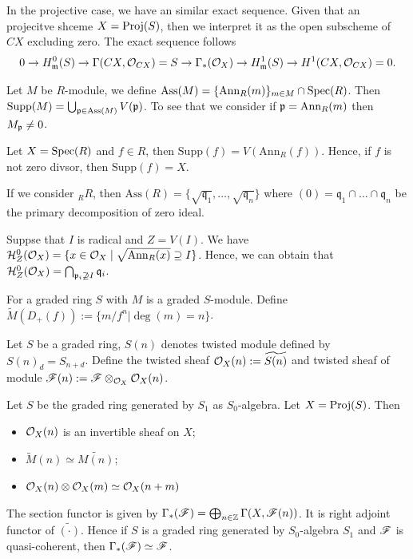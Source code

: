 {\np In the projective case, we have an similar exact sequence. Given that an projecitve shceme $X=\operatorname{Proj}(S)$, then we interpret it as the open subscheme of $CX$ excluding zero.
The exact sequence follows 
\begin{align*}
    0\to H^0_{\mathfrak{m}}(S) \to \Gamma(CX,\mathcal{O}_{CX})= S \to \Gamma_*(\mathcal{O}_X)\to  H^1_{\mathfrak{m}}(S) \to H^1(CX,\mathcal{O}_{CX})=0.
\end{align*}

\np Let $M$ be $R$-module, we define $\text{Ass}(M)=\{\text{Ann}_R(m)\}_{m\in M}\cap \operatorname{Spec}(R)$. Then $\text{Supp}(M)=\bigcup_{\mathfrak{p}\in \text{Ass}(M)}V(\mathfrak{p})$.
To see that we consider if $\mathfrak{p}=\text{Ann}_R(m)$ then $M_{\mathfrak{p}}\neq 0$.

\np Let $X=\operatorname{Spec}(R)$ and $f\in R$, then $\text{Supp}(f)=V(\text{Ann}_R(f))$. Hence, if $f$ is not zero divsor, then $\text{Supp}(f)=X$.

\np If we consider $_R R$, then $\text{Ass}(R)=\{\sqrt{\mathfrak{q}_1},\dots,\sqrt{\mathfrak{q}_n}\}$
where $(0) = {\mathfrak{q}_1}\cap \dots\cap {\mathfrak{q}_n}$ be the primary decomposition of zero ideal.

\np Suppse that $I$ is radical and $Z=V(I)$. We have $\mathcal{H}^0_Z(\mathcal{O}_X)=\{x\in\mathcal{O}_X\mid \sqrt{\text{Ann}_R(x)}\supseteq I\}$.
Hence, we can obtain that $\mathcal{H}^0_Z(\mathcal{O}_X)=\bigcap_{\mathfrak{p}_i\not\supseteq I}\mathfrak{q}_i$. 


\np For a graded ring $S$ with $M$ is a graded $S$-module. Define $\widetilde{M}(D_+(f)):=\{m/f^n|\deg(m)=n\}$.

\np Let $S$ be a graded ring, $S(n)$ denotes twisted module defined by $S(n)_{d}=S_{n+d}$. Define the twisted sheaf $\mathcal{O}_X(n):=\widetilde{S(n)}$ and twisted sheaf of module 
$\mathscr{F}(n):=\mathscr{F}\otimes_{\mathcal{O}_X}\mathcal{O}_X(n)$.


\np Let $S$ be the graded ring generated by $S_1$ as $S_0$-algebra. Let $X=\operatorname{Proj}(S)$.
Then
\begin{itemize}
    \item $\mathcal{O}_X(n)$ is an invertible sheaf on $X$;
    \item $\widetilde{M}(n)\simeq \widetilde{M(n)}$;  
    \item $\mathcal{O}_X(n)\otimes\mathcal{O}_X(m)\simeq \mathcal{O}_X(n+m)$
\end{itemize}

\np The section functor is given by $\Gamma_*(\mathscr{F})= \bigoplus_{n\in \mathbb{Z}}\Gamma(X,\mathscr{F}(n))$. It is right adjoint functor of $\widetilde{(\cdot)}$.
Hence if $S$ is a graded ring generated by $S_0$-algebra $S_1$ and $\mathscr{F}$ is quasi-coherent, then $\Gamma_*(\mathscr{F})\simeq \mathscr{F}$.

}
